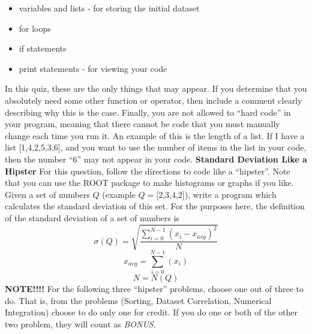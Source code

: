 \documentclass[12pt]{article}
\begin{document}
\begin{itemize}[noitemsep]
\item variables and lists - for storing the initial dataset
\item for loops
\item if statements
\item print statements - for viewing your code
\end{itemize}
In this quiz, these are the only things that may appear.   If you determine that you absolutely need some other function or operator, then include a comment clearly describing why this is the case.
\newline
\newline
Finally, you are not allowed to ``hard code'' in your program, meaning that there cannot be code that you must manually change each time you run it.  An example of this is the length of a list.  If I have a list [1,4,2,5,3,6], and you want to use the number of items in the list in your code, then the number ``6'' may not appear in your code.  
\newline
\newline
\newpage
\textbf{Standard Deviation Like a Hipster}
\newline
For this question, follow the directions to code like a ``hipster''.  Note that you can use the ROOT package to make histograms or graphs if you like.
\newline
\newline
Given a set of numbers $Q$ (example $Q=$[2,3,4,2]), write a program which calculates the standard deviation of this set.  For the purposes here, the definition of the standard deviation of a set of numbers is
\begin{displaymath}
\sigma(Q)=\sqrt{\frac{\displaystyle\sum_{i=0}^{N-1} (x_{i}-x_{avg})^2}{N}} 
\end{displaymath}
\begin{displaymath}
x_{avg}=\displaystyle\sum_{i=0}^{N-1} (x_{i})
\end{displaymath}
\begin{displaymath}
N=N(Q)
\end{displaymath}
\newline
\textbf{NOTE!!!!}
\newline
For the following three ``hipster'' problems, choose one out of three to do.  That is, from the problems (Sorting, Dataset Correlation, Numerical Integration) choose to do only one for credit.  If you do one or both of the other two problem, they will count as \textit{BONUS}.
\newline
\end{document}
